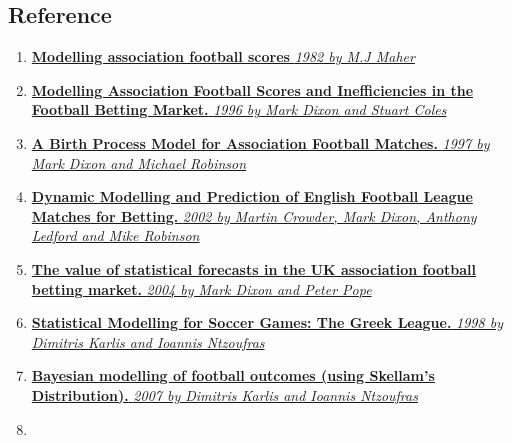 \documentclass[article]{jss}
\providecommand{\tightlist}{%
  \setlength{\itemsep}{0pt}\setlength{\parskip}{0pt}}
\begin{document}
\subsection{Reference}\label{reference}

\begin{enumerate}
\def\labelenumi{\arabic{enumi}.}
\tightlist
\item
  \href{https://github.com/scibrokes/odds-modelling-and-testing-inefficiency-of-sports-bookmakers/blob/master/reference/Maher1982.pdf}{\textbf{Modelling
  association football scores} \emph{1982 by M.J Maher}}
\item
  \href{https://github.com/scibrokes/odds-modelling-and-testing-inefficiency-of-sports-bookmakers/blob/master/reference/DixonColes1996.pdf}{\textbf{Modelling
  Association Football Scores and Inefficiencies in the Football Betting
  Market.} \emph{1996 by Mark Dixon and Stuart Coles}}
\item
  \href{https://github.com/scibrokes/odds-modelling-and-testing-inefficiency-of-sports-bookmakers/blob/master/reference/DixonRobinson1997.pdf}{\textbf{A
  Birth Process Model for Association Football Matches.} \emph{1997 by
  Mark Dixon and Michael Robinson}}
\item
  \href{https://github.com/scibrokes/odds-modelling-and-testing-inefficiency-of-sports-bookmakers/blob/master/reference/DixonLedfordRobinson2001.pdf}{\textbf{Dynamic
  Modelling and Prediction of English Football League Matches for
  Betting.} \emph{2002 by Martin Crowder, Mark Dixon, Anthony Ledford
  and Mike Robinson}}
\item
  \href{https://github.com/scibrokes/odds-modelling-and-testing-inefficiency-of-sports-bookmakers/blob/master/reference/DixonPope2004.pdf}{\textbf{The
  value of statistical forecasts in the UK association football betting
  market.} \emph{2004 by Mark Dixon and Peter Pope}}
\item
  \href{https://github.com/scibrokes/odds-modelling-and-testing-inefficiency-of-sports-bookmakers/blob/master/reference/KarlisNtzoufras1998.pdf}{\textbf{Statistical
  Modelling for Soccer Games: The Greek League.} \emph{1998 by Dimitris
  Karlis and Ioannis Ntzoufras}}
\item
  \href{https://github.com/scibrokes/odds-modelling-and-testing-inefficiency-of-sports-bookmakers/blob/master/reference/KarlisNtzoufras2007.pdf}{\textbf{Bayesian
  modelling of football outcomes (using Skellam's Distribution).}
  \emph{2007 by Dimitris Karlis and Ioannis Ntzoufras}}
\item

\end{enumerate}
\end{document}
